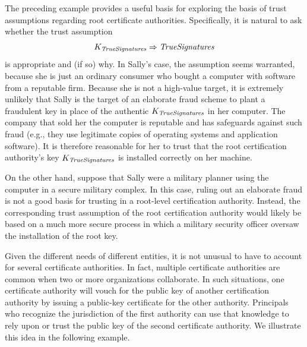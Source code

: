 The preceding example provides a useful basis for exploring the basis of
trust assumptions regarding root certificate authorities.  Specifically,
it is natural to ask whether the trust assumption
\[ K_{\textit{TrueSignatures}} \Rightarrow
\textrm{\ensuremath{\textit{TrueSignatures}}} \] is appropriate and (if so) why.  In
Sally's case, the assumption seems warranted, because she is just an
ordinary consumer who bought a computer with software from a reputable
firm.  Because she is not a high-value target, it is extremely unlikely
that Sally is the target of an elaborate fraud 
scheme to plant a fraudulent key in place of
the authentic $K_{\textit{TrueSignatures}}$ in her computer.  The company
that sold her the computer is reputable and has safeguards against such
fraud (e.g., they use legitimate copies of operating systems and
application software).  It is therefore reasonable for her to trust
that the root certification authority's key $K_{\textit{TrueSignatures}}$ is
installed correctly on her machine.

On the other hand, suppose that Sally were a military planner using the
computer in a secure military complex. In this case, ruling out an
elaborate fraud is not a good basis for trusting in a root-level
certification authority.  Instead, the corresponding trust assumption of
the root certification authority would likely be based on a much more
secure process in which a military security officer oversaw the
installation of the root key.

Given the different needs of different entities, it is not unusual to
have to account for several certificate 
authorities. In fact, multiple certificate authorities are common when
two or more organizations 
collaborate. In such situations, one certificate authority will vouch
for the public key of another certification authority by issuing a
public-key certificate for the other authority. Principals who recognize
the jurisdiction of the first authority can use that knowledge to rely
upon or trust the public key of the second certificate authority.  We
illustrate this idea in the following example.

